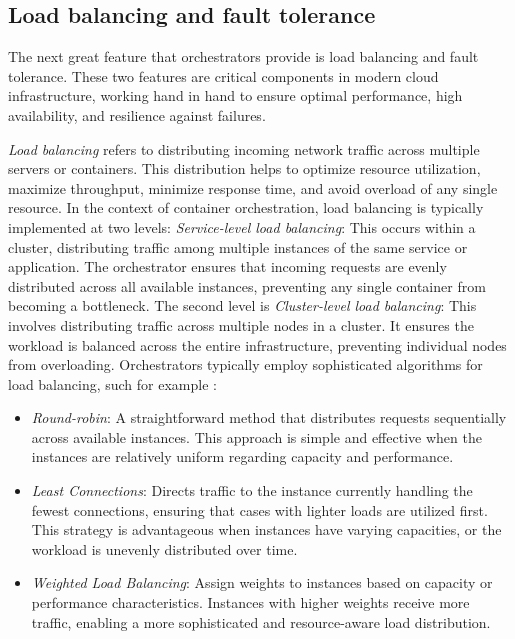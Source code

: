 \subsection{Load balancing and fault tolerance}\label{subsec:chpt1-load balancing}

The next great feature that orchestrators provide is load balancing and fault
tolerance.
These two features are critical components in modern cloud infrastructure,
working hand in hand to ensure optimal performance, high availability, and
resilience against failures.

\textit{Load balancing} refers to distributing incoming network traffic across
multiple servers or containers.
This distribution helps to optimize resource utilization, maximize throughput,
minimize response time, and avoid overload of any single resource.
In the context of container orchestration, load balancing is typically
implemented at two levels:
\textit{Service-level load balancing}: This occurs within a cluster,
distributing traffic among multiple instances of the same service or
application.
The orchestrator ensures that incoming requests are evenly distributed across
all available instances, preventing any single container from becoming a
bottleneck.
The second level is \textit{Cluster-level load balancing}: This involves
distributing traffic across multiple nodes in a cluster.
It ensures the workload is balanced across the entire infrastructure, preventing
individual nodes from overloading.
Orchestrators typically employ sophisticated algorithms for load balancing, such
for example \cite{Shafiq2022}:
\begin{itemize}
  \itemsep0em
    \item \textit{Round-robin}: A straightforward method that distributes
      requests sequentially across available instances.
      This approach is simple and effective when the instances are relatively
      uniform regarding capacity and performance.
    \item \textit{Least Connections}: Directs traffic to the instance currently
      handling the fewest connections, ensuring that cases with lighter loads
      are utilized first.
      This strategy is advantageous when instances have varying capacities, or
      the workload is unevenly distributed over time.
    \item \textit{Weighted Load Balancing}: Assign weights to instances based on
      capacity or performance characteristics. Instances with higher weights
      receive more traffic, enabling a more sophisticated and resource-aware
      load distribution.
    \end{itemize}

